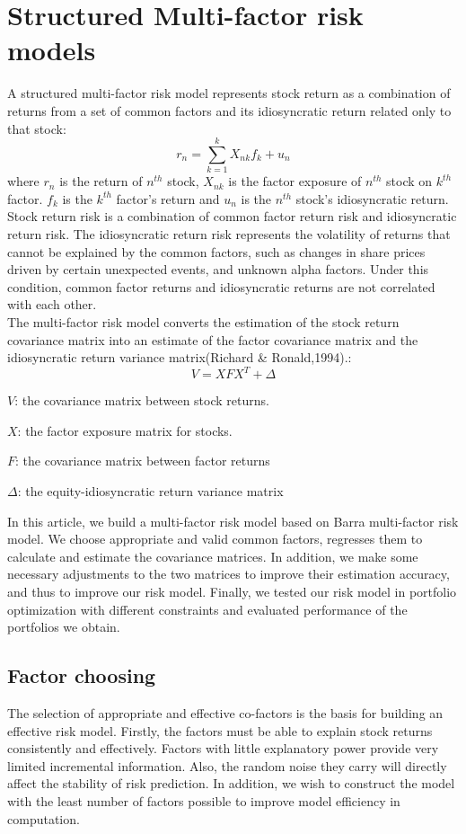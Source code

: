 \documentclass[10pt]{article}
\begin{document}
\section{Structured Multi-factor risk models}
A structured multi-factor risk model represents stock return as a combination of returns from a set of common factors and its idiosyncratic return related only to that stock:
\begin{equation}
    r_n=\sum_{k=1}^{k}X_{n k}f_k+u_n
\end{equation}
where $r_n$ is the return of $n^{th}$ stock, $X_{nk}$ is the factor exposure of $n^{th}$ stock on $k^{th}$ factor. $f_k$ is the $k^{th}$ factor’s return and $u_n$ is the $n^{th}$ stock’s idiosyncratic return.\\ 
Stock return risk is a combination of common factor return risk and idiosyncratic return risk. The idiosyncratic return risk represents the volatility of returns that cannot be explained by the common factors, such as changes in share prices driven by certain unexpected events, and unknown alpha factors. Under this condition, common factor returns and idiosyncratic returns are not correlated with each other. \\
The multi-factor risk model converts the estimation of the stock return covariance matrix into an estimate of the factor covariance matrix and the idiosyncratic return variance matrix(Richard \& Ronald,1994).:
\begin{equation}
    V=XFX^T+\Delta
\end{equation}

\centerline{$V$: the covariance matrix between stock returns.}
\centerline{$X$: the factor exposure matrix for stocks. }
\centerline{$F$: the covariance matrix between factor returns}
\centerline{$\Delta$: the equity-idiosyncratic return variance matrix}
In this article, we build a multi-factor risk model based on Barra multi-factor risk model. We choose appropriate and valid common factors, regresses them to calculate and estimate the covariance matrices. In addition, we make some necessary adjustments to the two matrices to improve their estimation accuracy, and thus to improve our risk model. Finally, we tested our risk model in portfolio optimization with different constraints and evaluated performance of the portfolios we obtain.\\

\subsection{Factor choosing}
 The selection of appropriate and effective co-factors is the basis for building an effective risk model. Firstly, the factors must be able to explain stock returns consistently and effectively. Factors with little explanatory power provide very limited incremental information. Also, the random noise they carry will directly affect the stability of risk prediction. In addition, we wish to construct the model with the least number of factors possible to improve model efficiency in computation.
 
\end{document}
